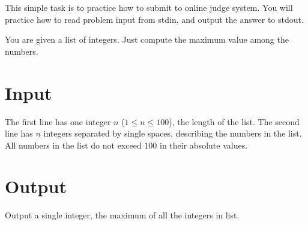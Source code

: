 
This simple task is to practice how to submit to online judge system.
You will practice how to read problem input from stdin, and output the answer to stdout.

You are given a list of integers.
Just compute the maximum value among the numbers.

\section*{Input}
The first line has one integer $n$ ($1 \leq n \leq 100$), the length of the list.
The second line has $n$ integers separated by single spaces, describing the numbers in the list.
All numbers in the list do not exceed $100$ in their absolute values.

\section*{Output}
Output a single integer, the maximum of all the integers in list.
